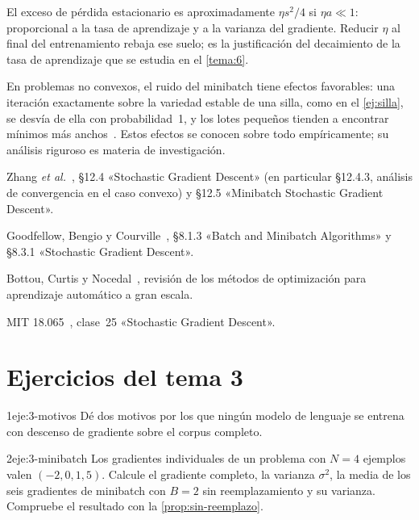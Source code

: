 El exceso de pérdida estacionario es aproximadamente $\eta s^{2}/4$ si $\eta a\ll 1$: proporcional a la tasa de aprendizaje y a la varianza del gradiente. Reducir $\eta$ al final del entrenamiento rebaja ese suelo; es la justificación del decaimiento de la tasa de aprendizaje que se estudia en el \cref{tema:6}.

\begin{observacion}
En problemas no convexos, el ruido del minibatch tiene efectos favorables: una iteración exactamente sobre la variedad estable de una silla, como en el \cref{ej:silla}, se desvía de ella con probabilidad~1, y los lotes pequeños tienden a encontrar mínimos más anchos~\cite{keskar}. Estos efectos se conocen sobre todo empíricamente; su análisis riguroso es materia de investigación.
\end{observacion}

\begin{lecturas}
\item Zhang \emph{et al.}~\cite{d2l}, §12.4 «Stochastic Gradient Descent» (en particular §12.4.3, análisis de convergencia en el caso convexo) y §12.5 «Minibatch Stochastic Gradient Descent».
\item Goodfellow, Bengio y Courville~\cite{gbc}, §8.1.3 «Batch and Minibatch Algorithms» y §8.3.1 «Stochastic Gradient Descent».
\item Bottou, Curtis y Nocedal~\cite{bottou}, revisión de los métodos de optimización para aprendizaje automático a gran escala.
\item MIT 18.065~\cite{mit18065}, clase~25 «Stochastic Gradient Descent».
\end{lecturas}

\section*{Ejercicios del tema 3}

\begin{ejercicio}{1}{eje:3-motivos}
Dé dos motivos por los que ningún modelo de lenguaje se entrena con descenso de gradiente sobre el corpus completo.
\end{ejercicio}

\begin{ejercicio}{2}{eje:3-minibatch}
Los gradientes individuales de un problema con $N=4$ ejemplos valen $(-2,0,1,5)$. Calcule el gradiente completo, la varianza $\sigma^{2}$, la media de los seis gradientes de minibatch con $B=2$ sin reemplazamiento y su varianza. Compruebe el resultado con la \cref{prop:sin-reemplazo}.
\end{ejercicio}

